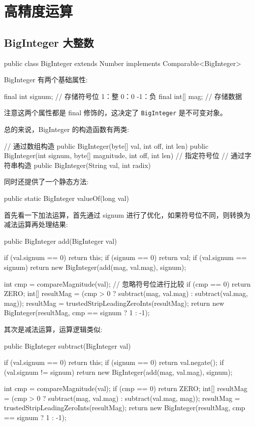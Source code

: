 \section{高精度运算}
\subsection{BigInteger 大整数}

\begin{Java}
public class BigInteger extends Number implements Comparable<BigInteger>
\end{Java}

BigInteger 有两个基础属性:

\begin{Java}
final int signum;     // 存储符号位 1：整  0：0 -1：负
final int[] mag;      // 存储数据
\end{Java}

注意这两个属性都是 final 修饰的，这决定了 \texttt{BigInteger} 是不可变对象。

总的来说，BigInteger 的构造函数有两类:
\begin{Java}
// 通过数组构造
public BigInteger(byte[] val, int off, int len)
public BigInteger(int signum, byte[] magnitude, int off, int len)   // 指定符号位
// 通过字符串构造
public BigInteger(String val, int radix)
\end{Java}

同时还提供了一个静态方法:
\begin{Java}
public static BigInteger valueOf(long val)
\end{Java}

首先看一下加法运算，首先通过 signum 进行了优化，如果符号位不同，则转换为减法运算再处理结果:
\begin{Java}
public BigInteger add(BigInteger val) {
    if (val.signum == 0)
        return this;
    if (signum == 0)
        return val;
    if (val.signum == signum)
        return new BigInteger(add(mag, val.mag), signum);

    int cmp = compareMagnitude(val);    // 忽略符号位进行比较
    if (cmp == 0)
        return ZERO;
    int[] resultMag = (cmp > 0 ? subtract(mag, val.mag)
                       : subtract(val.mag, mag));
    resultMag = trustedStripLeadingZeroInts(resultMag);
    return new BigInteger(resultMag, cmp == signum ? 1 : -1);
}
\end{Java}

其次是减法运算，运算逻辑类似:

\begin{Java}
public BigInteger subtract(BigInteger val) {
    if (val.signum == 0)
        return this;
    if (signum == 0)
        return val.negate();
    if (val.signum != signum)
        return new BigInteger(add(mag, val.mag), signum);

    int cmp = compareMagnitude(val);
    if (cmp == 0)
        return ZERO;
    int[] resultMag = (cmp > 0 ? subtract(mag, val.mag)
                       : subtract(val.mag, mag));
    resultMag = trustedStripLeadingZeroInts(resultMag);
    return new BigInteger(resultMag, cmp == signum ? 1 : -1);
}
\end{Java}

